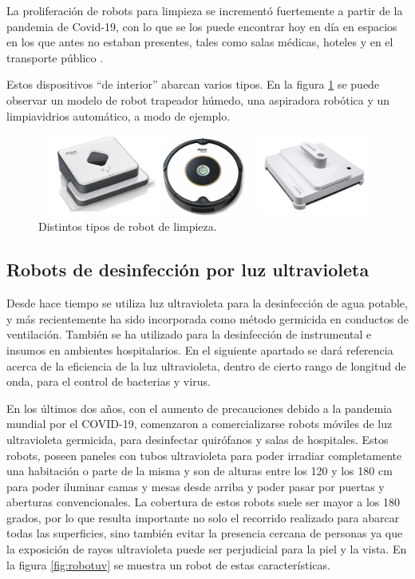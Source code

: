 La proliferación de robots para limpieza se incrementó fuertemente a partir de la pandemia de Covid-19, con lo que se los puede encontrar hoy en día en espacios en los que antes no estaban presentes, tales como salas médicas,  hoteles y en el transporte público \citep{Cleaning}. 

Estos dispositivos “de interior” abarcan varios tipos. En la  figura \ref{fig:robotslimpieza} se puede observar un modelo de robot trapeador húmedo, una aspiradora robótica y un limpiavidrios automático, a modo de ejemplo.

\begin{figure}[h]
	\centering
	\includegraphics[width=\textwidth]{./Figures/robotslimpieza.jpg}
	\caption{Distintos tipos de robot de limpieza\protect\footnotemark.}
	\label{fig:robotslimpieza}
\end{figure}



\subsection{Robots de desinfección por luz ultravioleta}

Desde hace tiempo se utiliza luz ultravioleta para la desinfección de agua potable, y más recientemente ha sido incorporada como método germicida en conductos de ventilación. También se ha utilizado para la desinfección de instrumental e insumos en ambientes hospitalarios. En el  siguiente apartado se dará referencia acerca de la eficiencia de la luz ultravioleta, dentro de cierto rango de longitud de onda, para el control de bacterias y virus.

En los últimos dos años, con el aumento de precauciones debido a la pandemia mundial por el COVID-19, comenzaron a comercializarse robots móviles de luz ultravioleta germicida, para desinfectar quirófanos y salas de hospitales. Estos robots, poseen paneles con tubos ultravioleta para poder irradiar completamente una habitación o parte de la misma y son de alturas entre los 120 y los 180 cm para poder iluminar camas y mesas desde arriba y poder pasar por puertas y aberturas convencionales. La cobertura de estos robots suele ser mayor a los 180 grados, por lo que resulta importante no solo el recorrido realizado para abarcar todas las superficies, sino también evitar la presencia cercana de personas ya que la exposición de rayos ultravioleta puede ser perjudicial para la piel y la vista. En la figura \ref{fig:robotuv} se muestra un robot de estas características. 



